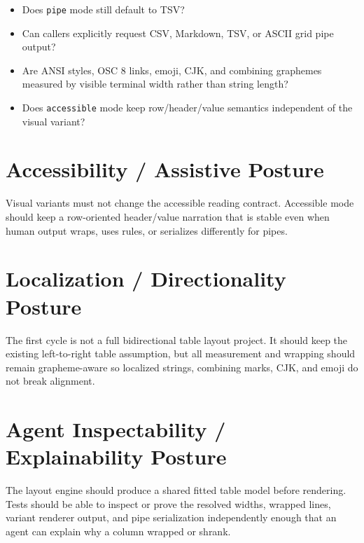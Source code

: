 \begin{itemize}
\item
  Does \texttt{p\allowbreak{}i\allowbreak{}p\allowbreak{}e} mode still default to TSV?
\item
  Can callers explicitly request CSV, Markdown, TSV, or ASCII grid pipe output?
\item
  Are ANSI styles, OSC 8 links, emoji, CJK, and combining graphemes measured by visible terminal width rather than string length?
\item
  Does \texttt{a\allowbreak{}c\allowbreak{}c\allowbreak{}e\allowbreak{}s\allowbreak{}s\allowbreak{}i\allowbreak{}b\allowbreak{}l\allowbreak{}e} mode keep row/header/value semantics independent of the visual variant?
\end{itemize}

\section{Accessibility / Assistive Posture}\label{record-133-accessibility-assistive-posture}

Visual variants must not change the accessible reading contract. Accessible mode should keep a row-oriented header/value narration that is stable even when human output wraps, uses rules, or serializes differently for pipes.

\section{Localization / Directionality Posture}\label{record-133-localization-directionality-posture}

The first cycle is not a full bidirectional table layout project. It should keep the existing left-to-right table assumption, but all measurement and wrapping should remain grapheme-aware so localized strings, combining marks, CJK, and emoji do not break alignment.

\section{Agent Inspectability / Explainability Posture}\label{record-133-agent-inspectability-explainability-posture}

The layout engine should produce a shared fitted table model before rendering. Tests should be able to inspect or prove the resolved widths, wrapped lines, variant renderer output, and pipe serialization independently enough that an agent can explain why a column wrapped or shrank.

